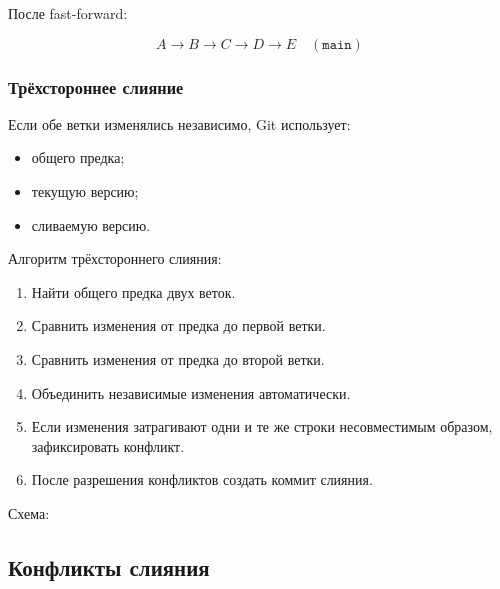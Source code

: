 \documentclass[12pt,a4paper]{article}
\begin{document}
После fast-forward:

\[
A \rightarrow B \rightarrow C \rightarrow D \rightarrow E \quad (\texttt{main})
\]

\subsubsection{Трёхстороннее слияние}

Если обе ветки изменялись независимо, Git использует:

\begin{itemize}
    \item общего предка;
    \item текущую версию;
    \item сливаемую версию.
\end{itemize}

Алгоритм трёхстороннего слияния:

\begin{enumerate}
    \item Найти общего предка двух веток.
    \item Сравнить изменения от предка до первой ветки.
    \item Сравнить изменения от предка до второй ветки.
    \item Объединить независимые изменения автоматически.
    \item Если изменения затрагивают одни и те же строки несовместимым образом, зафиксировать конфликт.
    \item После разрешения конфликтов создать коммит слияния.
\end{enumerate}

Схема:

\begin{center}
\end{center}

\subsection{Конфликты слияния}
\end{document}
